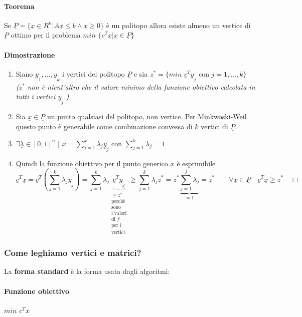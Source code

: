 \documentclass[12pt, twoside, letterpaper]{article}
\newcommand{\vp}[0]{
	\underline{P}
}
\newcommand{\vx}[0]{
	\underline{x}
}
\newcommand{\vy}[0]{
	\underline{y}
}
\begin{document}
				\paragraph{Teorema} Se $\vp = \{ \vx \in R^n | A \vx \leq b \land \vx \geq 0 \}$ è un politopo allora esiste almeno un vertice di $\vp$ ottimo per il problema $min$ $\{ c^T \vx | \vx \in \vp \}$
				
				\paragraph{Dimostrazione}
					\begin{enumerate}
						\item Siano $\vy_1, \dots, \vy_k$ i vertici del politopo $\vp$ e sia $z^* = \{ min$ $\underline{c}^T \vy_j$ con $j=1, \dots, k \} \quad$ \textit{($z^*$ non è nient'altro che il valore minimo della funzione obiettivo calcolata in tutti i vertici $\vy_j$.)}
						\item Sia $\vx \in \vp$ un punto qualsiasi del politopo, non vertice. Per Minkwoski-Weil questo punto è generabile come combinazione convessa di $k$ vertici di $\vp$.
						\item $\exists \underline{\lambda} \in [0,1]^n$ $|$ $\vx = \sum_{j=1}^k \lambda_j \vy_j$ con $\sum_{j=1}^k \lambda_j = 1$
						\item Quindi la funzione obiettivo per il punto generico $\vx$ è esprimibile
						$$\underline{c}^T \vx = \underline{c}^T (\sum_{j=1}^k \lambda_j \vy_j) = \sum_{j=1}^k \lambda_j \underbrace{\underline{c}^T \vy_j}_{\substack{\geq z^* \\ \text{perchè} \\ \text{sono} \\ \text{i valori} \\ \text{di $f$}\\ \text{per i} \\ \text{vertici}}} \geq \sum_{j=1}^k \lambda_j z^* = z^* \underbrace{\sum_{j=1}^j \lambda_j}_{=1} = z^* \quad \quad \forall \vx \in \vp \quad \underline{c}^T \vx \geq z^* \quad \Box$$								\end{enumerate}
			
			\subsubsection{Come leghiamo vertici e matrici?}
				La \textbf{forma standard} è la forma usata dagli algoritmi: 
				\paragraph{Funzione obiettivo} $min$ $c^Tx$
\end{document}

